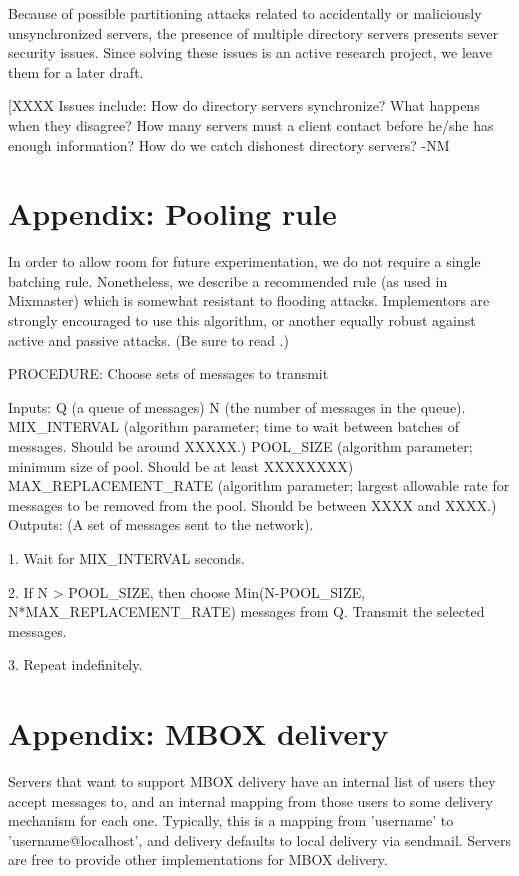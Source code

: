 Because of possible partitioning attacks related to accidentally or
maliciously unsynchronized servers, the presence of multiple directory
servers presents sever security issues.  Since solving these issues is
an active research project, we leave them for a later draft.

[XXXX Issues include:  How do directory servers synchronize?
   What happens when they disagree?  How many servers must a client
   contact before he/she has enough information?  How do we catch
   dishonest directory servers? -NM

\section{Appendix: Pooling rule}

In order to allow room for future experimentation, we do not require a
single batching rule.  Nonetheless, we describe a recommended rule (as
used in Mixmaster) which is somewhat resistant to flooding attacks.
Implementors are strongly encouraged to use this algorithm, or another
equally robust against active and passive attacks.  (Be sure to read
\cite{batching-taxonomy}.)

PROCEDURE: Choose sets of messages to transmit

Inputs: Q (a queue of messages)
        N (the number of messages in the queue).
	MIX_INTERVAL (algorithm parameter; time to wait between
                      batches of messages.  Should be around XXXXX.)
        POOL_SIZE (algorithm parameter; minimum size of pool.  Should
                   be at least XXXXXXXX)
        MAX_REPLACEMENT_RATE (algorithm parameter; largest allowable
                   rate for messages to be removed from the
                   pool. Should be between XXXX and XXXX.)
Outputs: (A set of messages sent to the network).

1. Wait for MIX_INTERVAL seconds.

2. If N > POOL_SIZE, then choose Min(N-POOL_SIZE, N*MAX_REPLACEMENT_RATE)
    messages from Q.  Transmit the selected messages.

3. Repeat indefinitely.

\section{Appendix: MBOX delivery}

Servers that want to support MBOX delivery have an internal list of
users they accept messages to, and an internal mapping from those
users to some delivery mechanism for each one.  Typically, this is a
mapping from 'username' to 'username@localhost', and delivery defaults
to local delivery via sendmail.  Servers are free to provide other
implementations for MBOX delivery.

